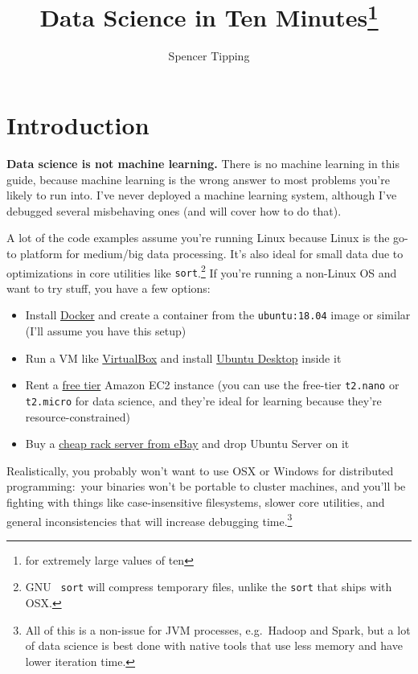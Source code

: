 \documentclass{article}
\title{Data Science in Ten Minutes\footnote{for extremely large values of ten}}
\author{Spencer Tipping}
\newcommand{\lnk}[2]{\href{#1}{\textcolor[rgb]{1.0,0.0,0.0}{#2}}}
\begin{document}
  \maketitle
  \tableofcontents

  \section*{Introduction}
  {\bf Data science is not machine learning.} There is no machine learning in
  this guide, because machine learning is the wrong answer to most problems
  you're likely to run into. I've never deployed a machine learning system,
  although I've debugged several misbehaving ones (and will cover how to do
  that).

  A lot of the code examples assume you're running Linux because Linux is the
  go-to platform for medium/big data processing. It's also ideal for small data
  due to optimizations in core utilities like {\tt sort}.\footnote{GNU {\tt
  sort} will compress temporary files, unlike the {\tt sort} that ships with
  OSX.} If you're running a non-Linux OS and want to try stuff, you have a few
  options:

  \begin{itemize}
    \item Install \lnk{https://docker.com}{Docker} and create a container from
          the {\tt ubuntu:18.04} image or similar (I'll assume you have this
          setup)
    \item Run a VM like \lnk{https://www.virtualbox.org/}{VirtualBox} and
          install \lnk{https://www.ubuntu.com/desktop}{Ubuntu Desktop} inside it
    \item Rent a \lnk{https://aws.amazon.com/free/}{free tier} Amazon EC2
          instance (you can use the free-tier {\tt t2.nano} or {\tt t2.micro}
          for data science, and they're ideal for learning because they're
          resource-constrained)
    \item Buy a
          \lnk{https://github.com/spencertipping/www/blob/master/datacenter.md}{cheap
          rack server from eBay} and drop Ubuntu Server on it
  \end{itemize}

  Realistically, you probably won't want to use OSX or Windows for distributed
  programming:~your binaries won't be portable to cluster machines, and you'll
  be fighting with things like case-insensitive filesystems, slower core
  utilities, and general inconsistencies that will increase debugging
  time.\footnote{All of this is a non-issue for JVM processes, e.g.~Hadoop and
  Spark, but a lot of data science is best done with native tools that use less
  memory and have lower iteration time.}
\end{document}
